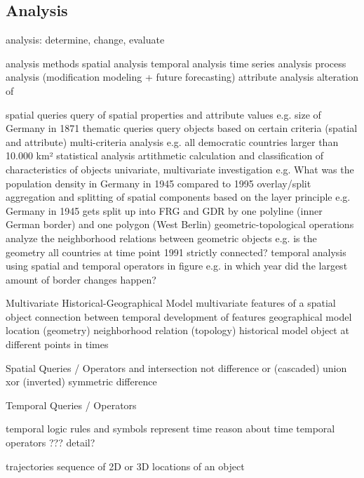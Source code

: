 \subsection{Analysis} %
\label{sub:analysis}


analysis: determine, change, evaluate

analysis methods
  spatial analysis
  temporal analysis
    time series analysis
    process analysis      (modification modeling + future forecasting)
  attribute analysis
alteration of \cite[p. 128]{ott2001time}

spatial queries
  query of spatial properties and attribute values
  e.g. size of Germany in 1871
thematic queries
  query objects based on certain criteria (spatial and attribute)
  multi-criteria analysis
  e.g. all democratic countries larger than 10.000 km²
statistical analysis
  artithmetic calculation and classification of characteristics of objects
  univariate, multivariate investigation
  e.g. What was the population density in Germany in 1945 compared to 1995
overlay/split
  aggregation and splitting of spatial components based on the layer principle
  e.g. Germany in 1945 gets split up into FRG and GDR by one polyline (inner German border) and one polygon (West Berlin)
geometric-topological operations
  analyze the neighborhood relations between geometric objects
  e.g. is the geometry all countries at time point 1991 strictly connected?
temporal analysis
  using spatial and temporal operators in figure
  e.g. in which year did the largest amount of border changes happen?
\cite[p. 129-140]{ott2001time}

Multivariate Historical-Geographical Model
  multivariate
    features of a spatial object
    connection between temporal development of features
  geographical model
    location (geometry)
    neighborhood relation (topology)
  historical model
    object at different points in times
  \cite[p. 128]{ott2001time}

Spatial Queries / Operators
  and     intersection
  not     difference
  or      (cascaded) union
  xor     (inverted) symmetric difference

Temporal Queries / Operators

temporal logic
  rules and symbols
  represent time
  reason about time
  temporal operators
  ??? detail?

  trajectories
    sequence of 2D or 3D locations of an object

